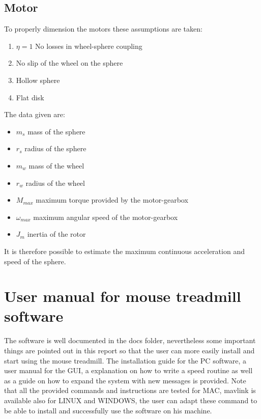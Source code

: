 \documentclass[12pt,a4paper]{article}
\begin{document}
\subsection{Motor}
To properly dimension the motors these assumptions are taken:
\begin{enumerate}
	\item $\eta = 1$ No losses in wheel-sphere coupling
	\item No slip of the wheel on the sphere
	\item Hollow sphere
	\item Flat disk
\end{enumerate}

The data given are:
\begin{itemize}
	\item $m_s$ mass of the sphere
	\item $r_s$ radius of the sphere
	\item $m_w$ mass of the wheel
	\item $r_w$ radius of the wheel
	\item $M_{max}$ maximum torque provided by the motor-gearbox 
	\item $\omega_{max}$ maximum angular speed of the motor-gearbox
	\item $J_m$ inertia of the rotor
\end{itemize}
It is therefore possible to estimate the maximum continuous  acceleration and speed of the sphere.
\section[User manual]{User manual for mouse treadmill software}
The software is well documented in the docs folder, nevertheless some important things are pointed out in this report so that the user can more easily install and start using the mouse treadmill. The installation guide for the PC software, a user manual for the GUI, a explanation on how to write a speed routine as well as a guide on how to expand the system with new messages is provided. Note that all the provided commands and instructions are tested for MAC, mavlink is available also for LINUX and WINDOWS, the user can adapt these command to be able to install and successfully use the software on his machine. 
\end{document}
